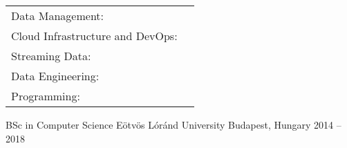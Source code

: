 \documentclass[]{awesome-cv}
\begin{document}
\begin{cventries}
	\cventry
	{}
	{\def\arraystretch{1.15}{\begin{tabular}{ l l }
		Data Management: & {\skill{ Snowflake, BigQuery, Redshift, DuckDB, Databricks, Data Lakes, Lakehouses }} \\
		Cloud Infrastructure and DevOps: & {\skill{ GCP, AWS, Terraform, Docker, Kubernetes, CI/CD, GNU/Linux }} \\
		Streaming Data: & {\skill{ Kafka, Flink, Redpanda, CDC, Kinesis }} \\
		Data Engineering: & {\skill{ SQL, dbt, Airflow, Prefect, Fivetran, Meltano, Spark, ETL/ELT }} \\
		Programming: & {\skill { Python, Java, Go, Shell Scripting }} \\
		\end{tabular}}}
	{}
	{}
	{}
\end{cventries}

\begin{cventries}
	\cventry
	{BSc in Computer Science}
	{Eötvös Lóránd University}
	{Budapest, Hungary}
    {2014 – 2018}
	{}
\end{cventries}
\end{document}
